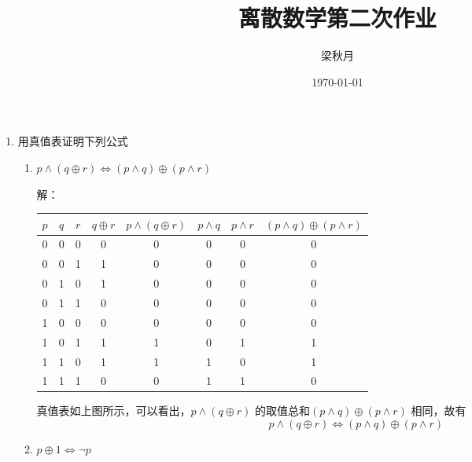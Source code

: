 \documentclass[UTF8]{ctexart}
\title{离散数学第二次作业}
\author{梁秋月}
\date{\today}
\begin{document}
   \maketitle
    \begin{enumerate}
        \item 用真值表证明下列公式
        \begin{enumerate}
            \item $p\wedge (q\oplus r)\Leftrightarrow (p \wedge q)\oplus (p\wedge r) $
            
            解：
            \begin{table}[H]
                \centering
                \begin{tabular}{|cccccccc|}
                    \hline
                    $p$ & $q$ & $r$ & $q\oplus r$ & $p\wedge (q\oplus r)$ & $p\wedge q$ & $p\wedge r$ & $(p \wedge q)\oplus (p\wedge r)$ \\
                    \hline
                    0 & 0 & 0 & 0 & 0 & 0 & 0 & 0 \\ 
                    \hline
                    0 & 0 & 1 & 1 & 0 & 0 & 0 & 0 \\
                    \hline
                    0 & 1 & 0 & 1 & 0 & 0 & 0 & 0 \\
                    \hline
                    0 & 1 & 1 & 0 & 0 & 0 & 0 & 0 \\
                    \hline
                    1 & 0 & 0 & 0 & 0 & 0 & 0 & 0 \\
                    \hline
                    1 & 0 & 1 & 1 & 1 & 0 & 1 & 1 \\
                    \hline
                    1 & 1 & 0 & 1 & 1 & 1 & 0 & 1 \\
                    \hline
                    1 & 1 & 1 & 0 & 0 & 1 & 1 & 0 \\
                    \hline
                \end{tabular}
            \end{table}
            真值表如上图所示，可以看出，$p\wedge (q\oplus r)$
            的取值总和$(p \wedge q)\oplus (p\wedge r)$
            相同，故有
            \[
                p\wedge (q\oplus r)\Leftrightarrow (p \wedge q)\oplus (p\wedge r)
            \]

            \item $p\oplus 1 \Leftrightarrow \neg p$
            

\end{enumerate}
\end{enumerate}
\end{document}
